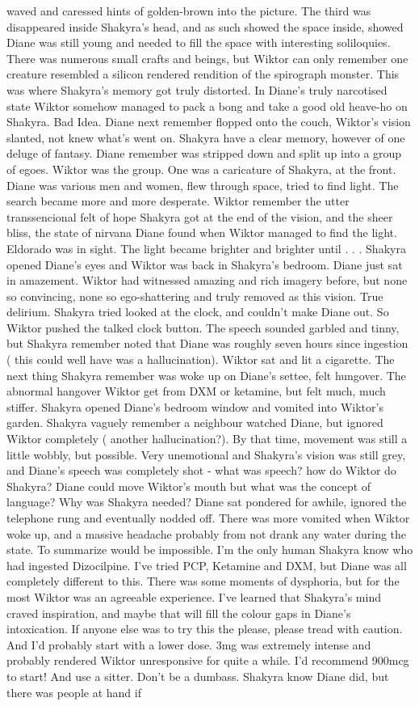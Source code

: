 \documentclass[12pt]{book}
\begin{document}
waved and caressed hints of golden-brown into the picture. The third was disappeared inside Shakyra's head, and as such showed the space inside, showed Diane was still young and needed to fill the space with interesting soliloquies. There was numerous small crafts and beings, but Wiktor can only remember one creature resembled a silicon rendered rendition of the spirograph monster. This was where Shakyra's memory got truly distorted. In Diane's truly narcotised state Wiktor somehow managed to pack a bong and take a good old heave-ho on Shakyra. Bad Idea. Diane next remember flopped onto the couch, Wiktor's vision slanted, not knew what's went on. Shakyra have a clear memory, however of one deluge of fantasy. Diane remember was stripped down and split up into a group of egoes. Wiktor was the group. One was a caricature of Shakyra, at the front. Diane was various men and women, flew through space, tried to find light. The search became more and more desperate. Wiktor remember the utter transsencional felt of hope Shakyra got at the end of the vision, and the sheer bliss, the state of nirvana Diane found when Wiktor managed to find the light. Eldorado was in sight. The light became brighter and brighter until . . .  Shakyra opened Diane's eyes and Wiktor was back in Shakyra's bedroom. Diane just sat in amazement. Wiktor had witnessed amazing and rich imagery before, but none so convincing, none so ego-shattering and truly removed as this vision. True delirium. Shakyra tried looked at the clock, and couldn't make Diane out. So Wiktor pushed the talked clock button. The speech sounded garbled and tinny, but Shakyra remember noted that Diane was roughly seven hours since ingestion ( this could well have was a hallucination). Wiktor sat and lit a cigarette. The next thing Shakyra remember was woke up on Diane's settee, felt hungover. The abnormal hangover Wiktor get from DXM or ketamine, but felt much, much stiffer. Shakyra opened Diane's bedroom window and vomited into Wiktor's garden. Shakyra vaguely remember a neighbour watched Diane, but ignored Wiktor completely ( another hallucination?). By that time, movement was still a little wobbly, but possible. Very unemotional and Shakyra's vision was still grey, and Diane's speech was completely shot - what was speech? how do Wiktor do Shakyra? Diane could move Wiktor's mouth but what was the concept of language? Why was Shakyra needed? Diane sat pondered for awhile, ignored the telephone rung and eventually nodded off. There was more vomited when Wiktor woke up, and a massive headache probably from not drank any water during the state. To summarize would be impossible. I'm the only human Shakyra know who had ingested Dizocilpine. I've tried PCP, Ketamine and DXM, but Diane was all completely different to this. There was some moments of dysphoria, but for the most Wiktor was an agreeable experience. I've learned that Shakyra's mind craved inspiration, and maybe that will fill the colour gaps in Diane's intoxication. If anyone else was to try this the please, please tread with caution. And I'd probably start with a lower dose. 3mg was extremely intense and probably rendered Wiktor unresponsive for quite a while. I'd recommend 900mcg to start! And use a sitter. Don't be a dumbass. Shakyra know Diane did, but there was people at hand if 
\end{document}
